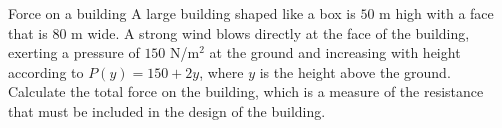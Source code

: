 \documentclass[../mathNotesPreamble]{subfiles}
\begin{document}
  \begin{ex*}{Force on a building}
    A large building shaped like a box is $50$ m high with a face that is $80$ m wide. A strong wind blows directly at the face of the building, exerting a pressure of $150$ N/m$^2$ at the ground and increasing with height according to $P(y)=150+2y$, where $y$ is the height above the ground. Calculate the total force on the building, which is a measure of the resistance that must be included in the design of the building.
  \end{ex*}
  \pagebreak
\end{document}
